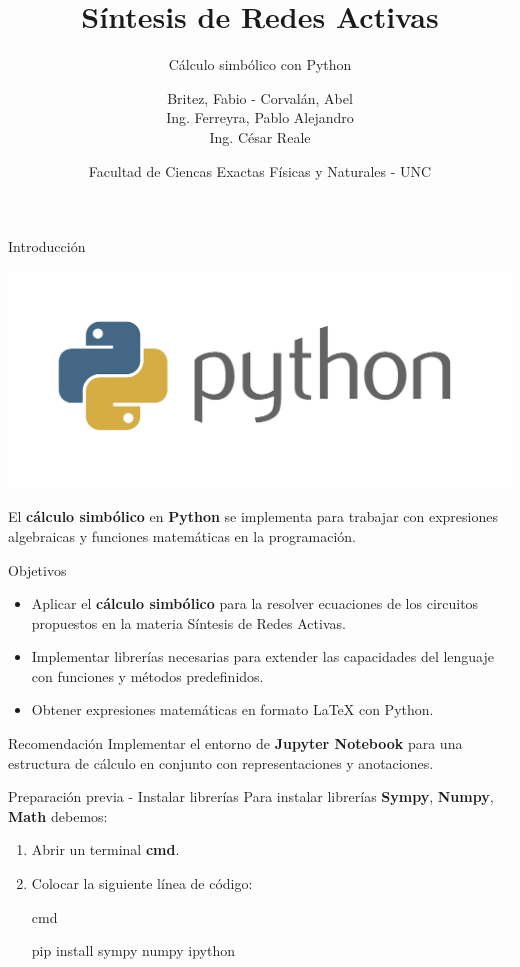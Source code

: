 \documentclass[14pt, aspectratio= 169]{beamer}
\title{Síntesis de Redes Activas}
\subtitle{Cálculo simbólico con Python}
\author{Britez, Fabio - Corvalán, Abel \\ Ing. Ferreyra, Pablo Alejandro \\ Ing. César Reale}
\date{Facultad de Ciencas Exactas Físicas y Naturales - UNC}
\begin{document}
\maketitle


\begin{frame}{Introducción}
\begin{minipage}{.484\linewidth}
\includegraphics[width=.9\linewidth]{img/python.png}
\end{minipage}
\begin{minipage}{.484\linewidth}
El \textbf<1>{cálculo simbólico} en \textbf<1>{Python} se implementa para trabajar con expresiones algebraicas y funciones matemáticas en la programación.  
\end{minipage}
\end{frame}

\begin{frame}{Objetivos}
\begin{itemize}
    \item Aplicar el \textbf<1>{cálculo simbólico} para la resolver ecuaciones de los circuitos propuestos en la materia Síntesis de Redes Activas.
    \item Implementar librerías necesarias para extender las capacidades del lenguaje con funciones y métodos predefinidos.
    \item Obtener expresiones matemáticas en formato LaTeX con Python.
\end{itemize}
\end{frame}

\begin{frame}{Recomendación}
  Implementar el entorno de \textbf{Jupyter Notebook} para una estructura de cálculo en conjunto con representaciones y anotaciones.  
\end{frame}

\begin{frame}{Preparación previa - Instalar librerías}
Para instalar librerías \textbf{Sympy}, \textbf{Numpy}, \textbf{Math} debemos:
\begin{enumerate}
    \item Abrir un terminal \textbf{cmd}.
    \item Colocar la siguiente línea de código:
    \begin{block}{cmd}
        \begin{semiverbatim}
            pip install sympy numpy ipython
        \end{semiverbatim}
    \end{block}
\end{enumerate}
\end{frame}
\end{document}
